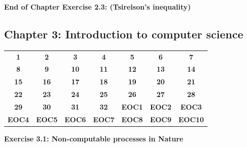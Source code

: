\documentclass{article}
\newcommand{\solved}[1]{\colorbox{green!30}{\textbf{#1}}}
\newcommand{\inProgress}[1]{\colorbox{yellow!30}{\textbf{#1}}}
\newcommand{\notStarted}[1]{\colorbox{red!30}{\textbf{#1}}}
\begin{document}
\bigskip

\begin{framed}
    \noindent \textbf{End of Chapter Exercise 2.3: (Tsirelson’s inequality)}
    
    \medskip
    
    
\end{framed}

\subsection*{Chapter 3: Introduction to computer science}

\begin{center}
\begin{tabular}{*{7}{c}}
\toprule
\notStarted{1} & \solved{2} & \notStarted{3} & \inProgress{4} & \notStarted{5} & \notStarted{6} & \notStarted{7} \\
\notStarted{8} & \notStarted{9} & \notStarted{10} & \solved{11} & \solved{12} & \notStarted{13} & \notStarted{14} \\
\notStarted{15} & \notStarted{16} & \notStarted{17} & \notStarted{18} & \notStarted{19} & \notStarted{20} & \notStarted{21} \\
\notStarted{22} & \notStarted{23} & \notStarted{24} & \notStarted{25} & \notStarted{26} & \notStarted{27} & \notStarted{28} \\
\notStarted{29} & \notStarted{30} & \notStarted{31} & \notStarted{32} & \notStarted{EOC1} & \notStarted{EOC2} & \notStarted{EOC3} \\
\notStarted{EOC4} & \notStarted{EOC5} & \notStarted{EOC6} & \notStarted{EOC7} & \notStarted{EOC8} & \notStarted{EOC9} & \notStarted{EOC10} \\
\bottomrule
\end{tabular}
\end{center}

\bigskip

\begin{framed}
    \noindent \textbf{Exercise 3.1: Non-computable processes in Nature}
    
    \medskip
    
    
\end{framed}

\bigskip
\end{document}
